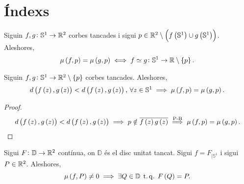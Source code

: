\section{Índexs}

\begin{teo*}
    Siguin $f, g \colon \mathbb{S}^1 \to \mathbb{R} ^2$ corbes tancades i sigui $p\in \mathbb{R}^2 \setminus \left( f\left( \mathbb{S}^1\right) \cup g\left( \mathbb{S}^1\right)\right)$. Aleshores,
    \[
        \mu \left( f, p\right) = \mu\left( g, p \right) \iff f \simeq g  \colon \mathbb{S}^1 \to \mathbb{R} \setminus \left\{ p \right\}.
    \]
\end{teo*}

\begin{teo*}[Rouché]
    Siguin $f, g \colon \mathbb{S}^1 \to \mathbb{R} ^2 \setminus \left\{ p \right\}$ corbes tancades. Aleshores,
    \[
        d \left( f \left( z \right), g \left( z \right) \right) < d \left( f \left( z \right), g \left( z \right) \right), \, \forall z\in \mathbb{S}^1 \implies \mu \left( f, p\right) = \mu\left( g, p \right).
    \]
    
\end{teo*}
\begin{proof}
    \[
        d \left( f \left( z \right), g \left( z \right) \right) < d \left( f \left( z \right), g \left( z \right) \right) \implies p \notin \overline{f\left( z \right) g \left( z \right)} \stackrel{\text{P-B}}{\implies} \mu \left( f, p\right) = \mu\left( g, p \right).
    \]
\end{proof}
\begin{teo*}
    Sigui $F\colon \mathbb{D} \to \mathbb{R} ^2$ contínua, on $\mathbb{D}$ és el disc unitat tancat. Sigui $f=F_{|\mathbb{S}^1}$ i sigui $P \in \mathbb{R} ^2$. Aleshores,
    \[
        \mu\left( f, P \right) \neq 0 \implies \exists Q \in \mathbb{D} \operatorname{\;t.q.\;} F\left( Q \right) = P.
    \]
\end{teo*}


